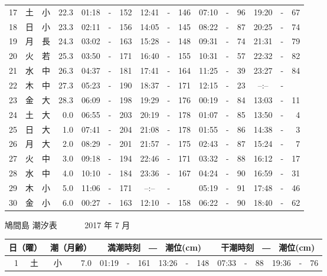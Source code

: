 \documentclass[12pt.a4j]{jsarticle}
\begin{document}
\begin{center}
\begin{table}[ht]
\begin{tabular}{|rc|cr|ccrccr|ccrccr|}
17 & 土 & 小 & 22.3 &  01:18 &-& 152  &  12:41 &-& 146  &   07:10 &-&  96  &   19:20 &-&  67  \\
18 & 日 & 小 & 23.3 &  02:11 &-& 156  &  14:05 &-& 145  &   08:22 &-&  87  &   20:25 &-&  74  \\
19 & 月 & 長 & 24.3 &  03:02 &-& 163  &  15:28 &-& 148  &   09:31 &-&  74  &   21:31 &-&  79  \\
20 & 火 & 若 & 25.3 &  03:50 &-& 171  &  16:40 &-& 155  &   10:31 &-&  57  &   22:32 &-&  82  \\
21 & 水 & 中 & 26.3 &  04:37 &-& 181  &  17:41 &-& 164  &   11:25 &-&  39  &   23:27 &-&  84  \\
22 & 木 & 中 & 27.3 &  05:23 &-& 190  &  18:37 &-& 171  &   12:15 &-&  23  &   --:-- &-&     \\
23 & 金 & 大 & 28.3 &  06:09 &-& 198  &  19:29 &-& 176  &   00:19 &-&  84  &   13:03 &-&  11  \\
24 & 土 & 大 &  0.0 &  06:55 &-& 203  &  20:19 &-& 178  &   01:07 &-&  85  &   13:50 &-&   4  \\
25 & 日 & 大 &  1.0 &  07:41 &-& 204  &  21:08 &-& 178  &   01:55 &-&  86  &   14:38 &-&   3  \\
26 & 月 & 大 &  2.0 &  08:29 &-& 201  &  21:57 &-& 175  &   02:43 &-&  87  &   15:24 &-&   7  \\
27 & 火 & 中 &  3.0 &  09:18 &-& 194  &  22:46 &-& 171  &   03:32 &-&  88  &   16:12 &-&  17  \\
28 & 水 & 中 &  4.0 &  10:10 &-& 184  &  23:36 &-& 167  &   04:24 &-&  90  &   16:59 &-&  31  \\
29 & 木 & 小 &  5.0 &  11:06 &-& 171  &  --:-- &-&     &   05:19 &-&  91  &   17:48 &-&  46  \\
30 & 金 & 小 &  6.0 &  00:27 &-& 163  &  12:10 &-& 158  &   06:22 &-&  90  &   18:40 &-&  62  \\
   \hline
   \end{tabular}
\end{table}
\newpage
 {\LARGE 鳩間島  潮汐表　　　}
 {\large 2017 年  7 月}\\
 \begin{table}[ht]
    \begin{tabular}{|rc|cr|ccrccr|ccrccr|}
    \hline
    \multicolumn{2}{|c|}{日（曜）} & \multicolumn{2}{c|}{潮（月齢）} & \multicolumn{6}{c|}{満潮時刻　―　潮位(cm)} & \multicolumn{6}{c|}{干潮時刻　―　潮位(cm)} \\
 \hline
 1 & 土 & 小 &  7.0 &  01:19 &-& 161  &  13:26 &-& 148  &   07:33 &-&  88  &   19:36 &-&  76  \\

\end{tabular}
\end{table}
\end{center}
\end{document}
